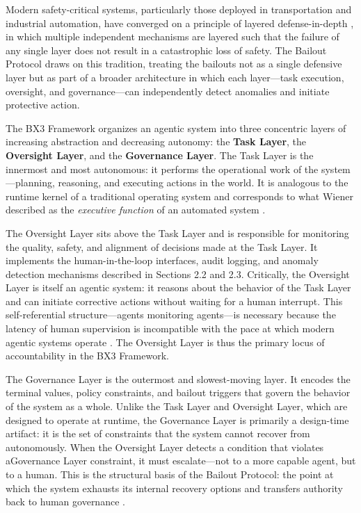 Modern safety-critical systems, particularly those deployed in
transportation and industrial automation, have converged on a
principle of layered defense-in-depth \cite{tristr81}, in which
multiple independent mechanisms are layered such that the failure of
any single layer does not result in a catastrophic loss of safety.
The Bailout Protocol draws on this tradition, treating the bailouts
not as a single defensive layer but as part of a broader architecture
in which each layer—task execution, oversight, and governance—can
independently detect anomalies and initiate protective action.

The BX3 Framework organizes an agentic system into three concentric
layers of increasing abstraction and decreasing autonomy: the
\textbf{Task Layer}, the \textbf{Oversight Layer}, and the
\textbf{Governance Layer}.  The Task Layer is the innermost and most
autonomous: it performs the operational work of the system—planning,
reasoning, and executing actions in the world.  It is analogous to the
runtime kernel of a traditional operating system and corresponds to
what Wiener described as the \emph{executive function} of an automated
system \cite{wiener1948}.

The Oversight Layer sits above the Task Layer and is responsible for
monitoring the quality, safety, and alignment of decisions made at the
Task Layer.  It implements the human-in-the-loop interfaces, audit
logging, and anomaly detection mechanisms described in Sections 2.2
and 2.3.  Critically, the Oversight Layer is itself an agentic system:
it reasons about the behavior of the Task Layer and can initiate
corrective actions without waiting for a human interrupt.  This
self-referential structure—agents monitoring agents—is necessary
because the latency of human supervision is incompatible with the pace
at which modern agentic systems operate \cite{bansal2019}.  The
Oversight Layer is thus the primary locus of accountability in the BX3
Framework.

The Governance Layer is the outermost and slowest-moving layer.  It
encodes the terminal values, policy constraints, and bailout triggers
that govern the behavior of the system as a whole.  Unlike the Task
Layer and Oversight Layer, which are designed to operate at runtime,
the Governance Layer is primarily a design-time artifact: it is the
set of constraints that the system cannot recover from autonomously.
When the Oversight Layer detects a condition that violates aGovernance
Layer constraint, it must escalate—not to a more capable agent, but
to a human.  This is the structural basis of the Bailout Protocol:
the point at which the system exhausts its internal recovery options
and transfers authority back to human governance \cite{tristr81}.

